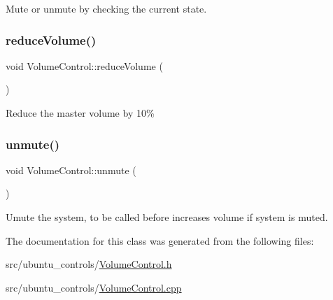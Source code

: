 Mute or unmute by checking the current state. \mbox{\label{classVolumeControl_ad8e3e3740268388e906984fa807761a1}} 
\subsubsection{\texorpdfstring{reduce\+Volume()}{reduceVolume()}}
{\footnotesize\ttfamily void Volume\+Control\+::reduce\+Volume (\begin{DoxyParamCaption}{ }\end{DoxyParamCaption})}

Reduce the master volume by 10\% \mbox{\label{classVolumeControl_a4a541c510e22cd07b206ca80f979c1a1}} 
\subsubsection{\texorpdfstring{unmute()}{unmute()}}
{\footnotesize\ttfamily void Volume\+Control\+::unmute (\begin{DoxyParamCaption}{ }\end{DoxyParamCaption})}

Umute the system, to be called before increases volume if system is muted. 

The documentation for this class was generated from the following files\+:\begin{DoxyCompactItemize}
\item 
src/ubuntu\+\_\+controls/\hyperlink{VolumeControl_8h}{Volume\+Control.\+h}\item 
src/ubuntu\+\_\+controls/\hyperlink{VolumeControl_8cpp}{Volume\+Control.\+cpp}\end{DoxyCompactItemize}
